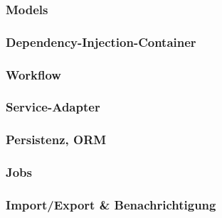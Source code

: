 \subsubsection{Models}

\subsubsection{Dependency-Injection-Container}

\subsubsection{Workflow}

\subsubsection{Service-Adapter}

\subsubsection{Persistenz, ORM}

\subsubsection{Jobs}

\subsubsection{Import/Export \& Benachrichtigung}




